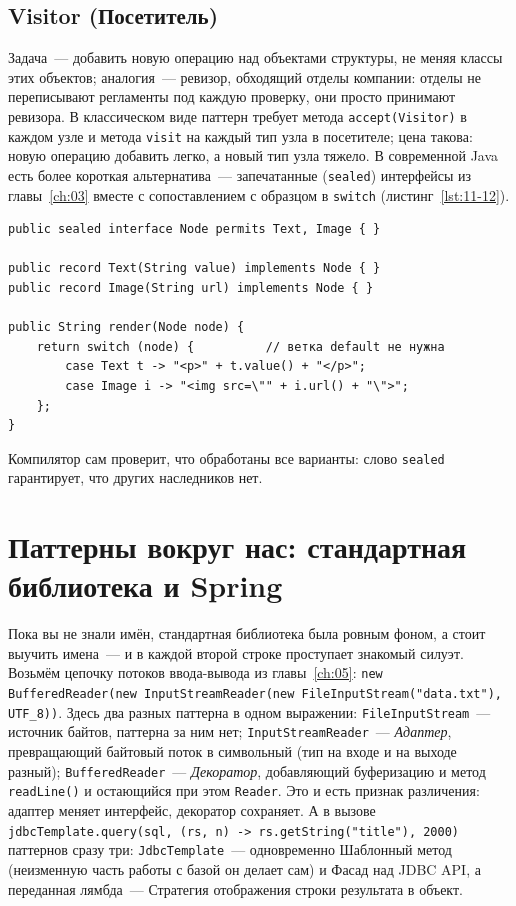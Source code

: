 \subsection{Visitor (Посетитель)}

Задача~--- добавить новую операцию над объектами структуры, не меняя классы этих
объектов; аналогия~--- ревизор, обходящий отделы компании: отделы не переписывают
регламенты под каждую проверку, они просто принимают ревизора. В классическом
виде паттерн требует метода \texttt{accept(Visitor)} в каждом узле и метода
\texttt{visit} на каждый тип узла в посетителе; цена такова: новую операцию
добавить легко, а новый тип узла тяжело. В современной Java есть более короткая
альтернатива~--- запечатанные (\texttt{sealed}) интерфейсы из главы~\ref{ch:03}
вместе с сопоставлением с образцом в \texttt{switch}
(листинг~\ref{lst:11-12}).

\begin{listing}[H]
\begin{verbatim}
public sealed interface Node permits Text, Image { }

public record Text(String value) implements Node { }
public record Image(String url) implements Node { }

public String render(Node node) {
    return switch (node) {          // ветка default не нужна
        case Text t -> "<p>" + t.value() + "</p>";
        case Image i -> "<img src=\"" + i.url() + "\">";
    };
}
\end{verbatim}
\caption{Обход структуры через sealed-интерфейс и switch}
\label{lst:11-12}
\end{listing}

Компилятор сам проверит, что обработаны все варианты: слово \texttt{sealed}
гарантирует, что других наследников нет.

\section{Паттерны вокруг нас: стандартная библиотека и Spring}

Пока вы не знали имён, стандартная библиотека была ровным фоном, а стоит выучить
имена~--- и в каждой второй строке проступает знакомый силуэт. Возьмём цепочку
потоков ввода-вывода из главы~\ref{ch:05}:
\texttt{new BufferedReader(new InputStreamReader(new
FileInputStream("data.txt"), UTF\_8))}. Здесь два разных паттерна в одном
выражении: \texttt{FileInputStream}~--- источник байтов, паттерна за ним нет;
\texttt{InputStreamReader}~--- \emph{Адаптер}, превращающий байтовый поток в
символьный (тип на входе и на выходе разный); \texttt{BufferedReader}~---
\emph{Декоратор}, добавляющий буферизацию и метод \texttt{readLine()} и
остающийся при этом \texttt{Reader}. Это и есть признак различения: адаптер
меняет интерфейс, декоратор сохраняет. А в вызове
\texttt{jdbcTemplate.query(sql, (rs, n) -> rs.getString("title"), 2000)}
паттернов сразу три: \texttt{JdbcTemplate}~--- одновременно Шаблонный метод
(неизменную часть работы с базой он делает сам) и Фасад над JDBC API, а
переданная лямбда~--- Стратегия отображения строки результата в объект.


